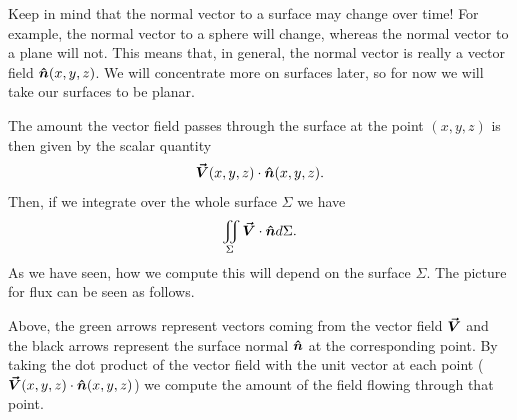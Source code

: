        	\begin{figure}[H]
       		\centering
       		\def\svgwidth{0.75\columnwidth}
       		
       	\end{figure}

       	 Keep in mind that the normal vector to a surface may change over time!  For example, the normal vector to a sphere will change, whereas the normal vector to a plane will not. This means that, in general, the normal vector is really a vector field $\boldsymbol{\hat{n}}(x,y,z)$. We will concentrate more on surfaces later, so for now we will take our surfaces to be planar.

       	The amount the vector field passes through the surface at the point $(x,y,z)$ is then given by the scalar quantity
       	\[
       	\boldsymbol{\vec{V}}(x,y,z) \cdot \boldsymbol{\hat{n}}(x,y,z).
       	\]
       	Then, if we integrate over the whole surface $\Sigma$ we have
       	\[
       	\iint_\Sigma  \boldsymbol{\vec{V}} \cdot \boldsymbol{\hat{n}} d\Sigma.
       	\]
        As we have seen, how we compute this will depend on the surface $\Sigma$. The picture for flux can be seen as follows.

               	\begin{figure}[H]
               		\centering
               		\def\svgwidth{0.75\columnwidth}
               		
               	\end{figure}

         Above, the green arrows represent vectors coming from the vector field $\boldsymbol{\vec{V}}$ and the black arrows represent the surface normal $\boldsymbol{\hat{n}}$ at the corresponding point. By taking the dot product of the vector field with the unit vector at each point ($\boldsymbol{\vec{V}}(x,y,z)\cdot \boldsymbol{\hat{n}}(x,y,z)$) we compute the amount of the field flowing through that point.

